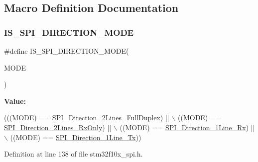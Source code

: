 \subsection{Macro Definition Documentation}
\mbox{\label{group___s_p_i__data__direction_ga536857c68ce1d9806c04046707448b3e}} 
\subsubsection{\texorpdfstring{I\+S\+\_\+\+S\+P\+I\+\_\+\+D\+I\+R\+E\+C\+T\+I\+O\+N\+\_\+\+M\+O\+DE}{IS\_SPI\_DIRECTION\_MODE}}
{\footnotesize\ttfamily \#define I\+S\+\_\+\+S\+P\+I\+\_\+\+D\+I\+R\+E\+C\+T\+I\+O\+N\+\_\+\+M\+O\+DE(\begin{DoxyParamCaption}\item[{}]{M\+O\+DE }\end{DoxyParamCaption})}

{\bfseries Value\+:}
\begin{DoxyCode}
(((MODE) == \hyperlink{group___s_p_i__data__direction_gab6bdb82e315a90210c4425c46bbdf5f1}{SPI\_Direction\_2Lines\_FullDuplex}) || \(\backslash\)
                                     ((MODE) == \hyperlink{group___s_p_i__data__direction_gab8ab942f7240394f50e4c86c5288516a}{SPI\_Direction\_2Lines\_RxOnly}) || 
      \(\backslash\)
                                     ((MODE) == \hyperlink{group___s_p_i__data__direction_ga42ea8306cfc1f23ffc51efae6f66320e}{SPI\_Direction\_1Line\_Rx}) || \(\backslash\)
                                     ((MODE) == \hyperlink{group___s_p_i__data__direction_ga70cc710a771065b2ed11c2ac9697defe}{SPI\_Direction\_1Line\_Tx}))
\end{DoxyCode}


Definition at line 138 of file stm32f10x\+\_\+spi.\+h.

\mbox{\label{group___s_p_i__data__direction_ga42ea8306cfc1f23ffc51efae6f66320e}} 
